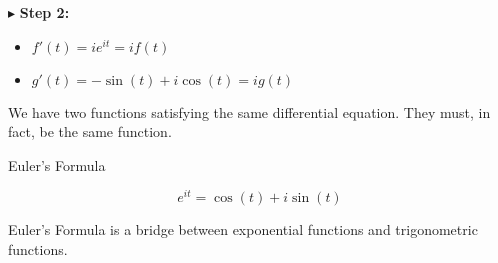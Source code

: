 \documentclass{ximera}
\begin{document}
$\blacktriangleright$   \textbf{Step 2:}



\begin{itemize}
	\item $f'(t) = i e^{i t} = i f(t)$
	\item $g'(t) = -\sin(t) + i \cos(t) = i g(t)$
\end{itemize}



We have two functions satisfying the same differential equation.  They must, in fact, be the same function.




\begin{theorem} Euler's Formula


\[   e^{i t} = \cos(t) + i \sin(t)         \]


\end{theorem}




Euler's Formula is a bridge between exponential functions and trigonometric functions.
\end{document}
